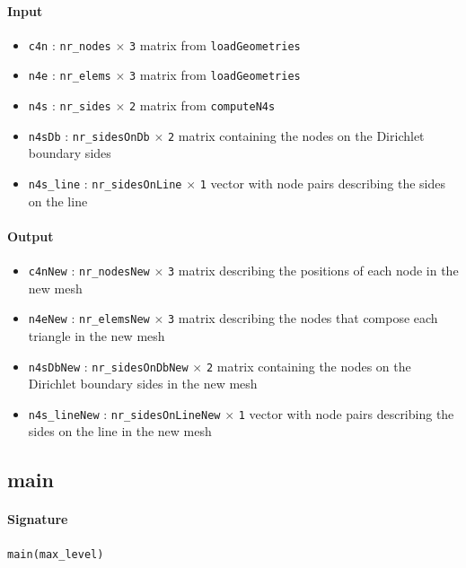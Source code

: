 \documentclass[11pt,a4paper]{article}
\newcommand{\matrixdim}[2]{\texttt{#1} $\times$ \texttt{#2}}
\begin{document}
\paragraph{Input}
\begin{itemize}
    \item \texttt{c4n} : \matrixdim{nr\_nodes}{3} matrix from \texttt{loadGeometries}
    \item \texttt{n4e} : \matrixdim{nr\_elems}{3} matrix from \texttt{loadGeometries}
    \item \texttt{n4s} : \matrixdim{nr\_sides}{2} matrix from \texttt{computeN4s}
    \item \texttt{n4sDb} : \matrixdim{nr\_sidesOnDb}{2} matrix containing the nodes on the Dirichlet boundary sides
    \item \texttt{n4s\_line} : \matrixdim{nr\_sidesOnLine}{1} vector with node pairs describing the sides on the line
\end{itemize}

\paragraph{Output}
\begin{itemize}
    \item \texttt{c4nNew} : \matrixdim{nr\_nodesNew}{3} matrix describing the positions of each node in the new mesh
    \item \texttt{n4eNew} : \matrixdim{nr\_elemsNew}{3} matrix describing the nodes that compose each triangle in the new mesh
    \item \texttt{n4sDbNew} : \matrixdim{nr\_sidesOnDbNew}{2} matrix containing the nodes on the Dirichlet boundary sides in the new mesh
    \item \texttt{n4s\_lineNew} : \matrixdim{nr\_sidesOnLineNew}{1} vector with node pairs describing the sides on the line in the new mesh
\end{itemize}


\subsection{main}

\paragraph{Signature}
\begin{verbatim}
main(max_level)
\end{verbatim}
\end{document}
